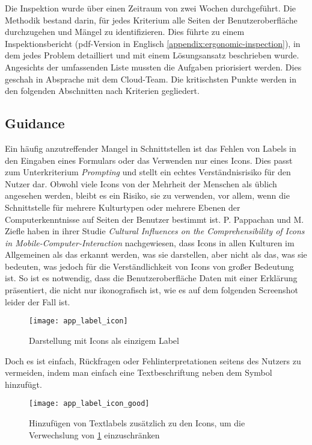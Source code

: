 
Die Inspektion wurde über einen Zeitraum von zwei Wochen durchgeführt. Die Methodik bestand darin, für jedes Kriterium alle Seiten der Benutzeroberfläche durchzugehen und Mängel zu identifizieren.
Dies führte zu einem Inspektionsbericht (pdf-Version in Englisch \ref{appendix:ergonomic-inspection}), in dem jedes Problem detailliert und mit einem Lösungsansatz beschrieben wurde. Angesichts der umfassenden Liste mussten die Aufgaben priorisiert werden.
Dies geschah in Absprache mit dem Cloud-Team.
Die kritischsten Punkte werden in den folgenden Abschnitten nach Kriterien gegliedert.

\subsection{Guidance} \label{sec:guidance}

Ein häufig anzutreffender Mangel in Schnittstellen ist das Fehlen von Labels in den Eingaben eines Formulars oder das Verwenden nur eines Icons.
Dies passt zum Unterkriterium \textit{Prompting} und stellt ein echtes Verständnisrisiko für den Nutzer dar.
Obwohl viele Icons von der Mehrheit der Menschen als üblich angesehen werden, bleibt es ein Risiko, sie zu verwenden, vor allem, wenn die Schnittstelle für mehrere Kulturtypen oder mehrere Ebenen der Computerkenntnisse auf Seiten der Benutzer bestimmt ist.
P. Pappachan und M. Ziefle haben in ihrer Studie \textit{Cultural Influences on the Comprehensibility of Icons in Mobile-Computer-Interaction}\cite{iconsCultureInfluence} nachgewiesen, dass Icons in allen Kulturen im Allgemeinen als das erkannt werden, was sie darstellen, aber nicht als das, was sie bedeuten, was jedoch für die Verständlichkeit von Icons von großer Bedeutung ist.
So ist es notwendig, dass die Benutzeroberfläche Daten mit einer Erklärung präsentiert, die nicht nur ikonografisch ist, wie es auf dem folgenden Screenshot leider der Fall ist.

\begin{figure}[H]
  \centering
  \texttt{[image: app\_label\_icon]}
  \caption{Darstellung mit Icons als einzigem Label}
  \label{fig:app_label_icon}
\end{figure}

Doch es ist einfach, Rückfragen oder Fehlinterpretationen seitens des Nutzers zu vermeiden, indem man einfach eine Textbeschriftung neben dem Symbol hinzufügt.

\begin{figure}[H]
  \centering
  \texttt{[image: app\_label\_icon\_good]}
  \caption{Hinzufügen von Textlabels zusätzlich zu den Icons, um die Verwechslung von \ref{fig:app_label_icon} einzuschränken}
\end{figure}


